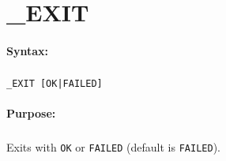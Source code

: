 
\newpage
\section{\_EXIT}
\label{cmd:_EXIT}

\paragraph{Syntax:}
\subparagraph{}
\texttt{\_EXIT [OK|FAILED]}

\paragraph{Purpose:}
\subparagraph{}
Exits with \texttt{OK} or \texttt{FAILED} (default is \texttt{FAILED}).
